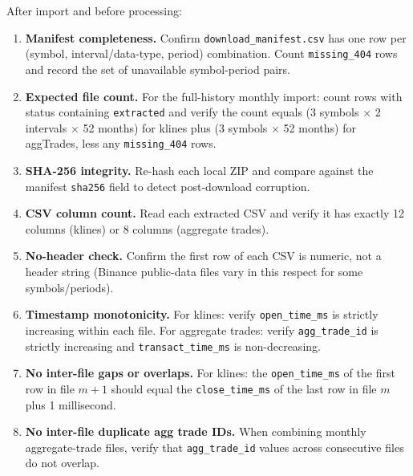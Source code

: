 \documentclass[11pt,a4paper]{article}
\begin{document}
After import and before processing:

\begin{enumerate}
  \item \textbf{Manifest completeness.}
        Confirm \texttt{download\_manifest.csv} has one row per
        (symbol, interval/data-type, period) combination. Count
        \texttt{missing\_404} rows and record the set of unavailable
        symbol-period pairs.

  \item \textbf{Expected file count.}
        For the full-history monthly import:
        count rows with status containing \texttt{extracted} and
        verify the count equals
        (3 symbols $\times$ 2 intervals $\times$ 52 months) for
        klines plus (3 symbols $\times$ 52 months) for aggTrades,
        less any \texttt{missing\_404} rows.

  \item \textbf{SHA-256 integrity.}
        Re-hash each local ZIP and compare against the manifest
        \texttt{sha256} field to detect post-download corruption.

  \item \textbf{CSV column count.}
        Read each extracted CSV and verify it has exactly 12 columns
        (klines) or 8 columns (aggregate trades).

  \item \textbf{No-header check.}
        Confirm the first row of each CSV is numeric, not a header
        string (Binance public-data files vary in this respect for
        some symbols/periods).

  \item \textbf{Timestamp monotonicity.}
        For klines: verify \texttt{open\_time\_ms} is strictly
        increasing within each file. For aggregate trades: verify
        \texttt{agg\_trade\_id} is strictly increasing and
        \texttt{transact\_time\_ms} is non-decreasing.

  \item \textbf{No inter-file gaps or overlaps.}
        For klines: the \texttt{open\_time\_ms} of the first row in
        file $m{+}1$ should equal the \texttt{close\_time\_ms} of the
        last row in file $m$ plus 1 millisecond.

  \item \textbf{No inter-file duplicate agg trade IDs.}
        When combining monthly aggregate-trade files, verify that
        \texttt{agg\_trade\_id} values across consecutive files do not
        overlap.


\end{enumerate}
\end{document}
